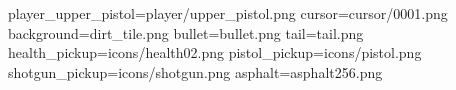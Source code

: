 player_upper_pistol=player/upper_pistol.png
cursor=cursor/0001.png
background=dirt_tile.png
bullet=bullet.png
tail=tail.png
health_pickup=icons/health02.png
pistol_pickup=icons/pistol.png
shotgun_pickup=icons/shotgun.png
asphalt=asphalt256.png

